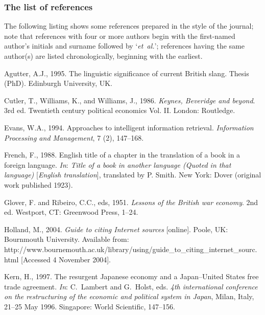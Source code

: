 \documentclass[]{cJEN2e}
\begin{document}
\subsubsection{The list of references} The following listing shows some references prepared in the style of the
journal; note that references with four or more authors begin with the first-named author's initials and
surname followed by `{\em{et~al.}}'; references having the same author(s) are listed chronologically, beginning with the earliest.
%
%
\begin{thebibliography}{9}


Agutter, A.J., 1995. The linguistic significance of current British slang.
  Thesis (PhD). Edinburgh University, UK.

Cutler, T., Williams, K., and Williams, J., 1986. {\itshape Keynes, Beveridge and
  beyond}. 3rd ed. Twentieth century political economics Vol. II. London:
  Routledge.

Evans, W.A., 1994. Approaches to intelligent information retrieval. {\itshape
  Information Processing and Management}, 7 (2), 147--168.

French, F., 1988. English title of a chapter in the translation of a book in a
  foreign language.  {\itshape{In}}: {\itshape Title of a book in another language (Quoted in
  that language)}  [{\itshape English translation}],  translated by P. Smith.
  New York: Dover (original work published 1923).

Glover, F. and Ribeiro, C.C., eds, 1951. {\itshape
Lessons of the British war economy}. 2nd ed. Westport, CT: Greenwood Press, 1--24.

Holland, M., 2004. {\itshape Guide to citing Internet sources} [online]. Poole, UK: Bournmouth University. Available from:
  http://www.bournemouth.ac.uk/library/using/guide\_to\_citing\_internet\_sourc.%
  html [Accessed 4 November 2004].

Kern, H., 1997. The resurgent Japanese economy and a Japan--United States free trade
  agreement. {\itshape {In}}: C.~Lambert and G.~Holst, eds. {\itshape 4th international conference on the restructuring of the economic and political system in Japan}, Milan, Italy, 21--25 May 1996. Singapore: World Scientific, 147--156.


\end{thebibliography}
\end{document}
